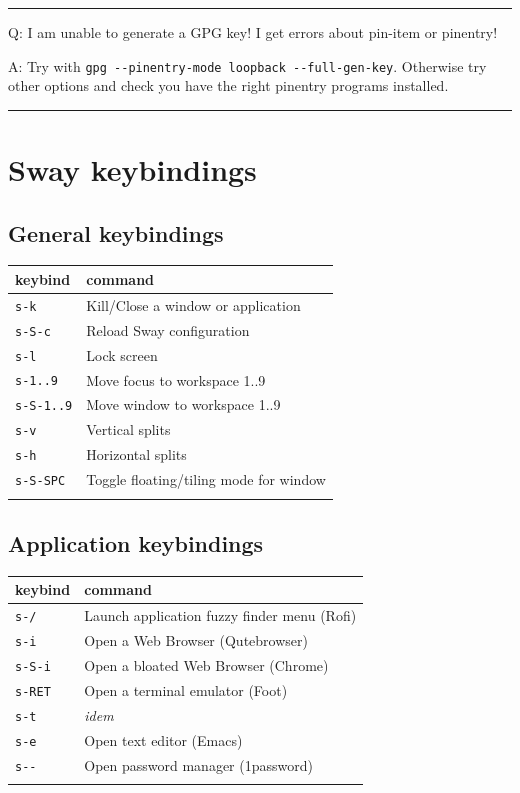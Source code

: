 \documentclass[11pt]{article}
\begin{document}
\noindent\rule{\textwidth}{0.5pt}

Q: I am unable to generate  a GPG key! I get errors about pin-item or pinentry!

A: Try with \texttt{gpg -{}-{}pinentry-mode loopback -{}-{}full-gen-key}. Otherwise try other options and check you have the right pinentry programs installed.

\noindent\rule{\textwidth}{0.5pt}

\section{Sway keybindings}
\label{sec:org735c8e1}

\subsection{General keybindings}
\label{sec:orgd6eaa6f}

\begin{center}
\begin{tabular}{ll}
keybind & command\\[0pt]
\hline
\texttt{s-k} & Kill/Close a window or application\\[0pt]
\texttt{s-S-c} & Reload Sway configuration\\[0pt]
\texttt{s-l} & Lock screen\\[0pt]
\texttt{s-1..9} & Move focus to workspace 1..9\\[0pt]
\texttt{s-S-1..9} & Move window to workspace 1..9\\[0pt]
\texttt{s-v} & Vertical splits\\[0pt]
\texttt{s-h} & Horizontal splits\\[0pt]
\texttt{s-S-SPC} & Toggle floating/tiling mode for window\\[0pt]
 & \\[0pt]
\hline
\end{tabular}
\end{center}

\subsection{Application keybindings}
\label{sec:org63887aa}


\begin{center}
\begin{tabular}{ll}
keybind & command\\[0pt]
\hline
\texttt{s-/} & Launch application fuzzy finder menu (Rofi)\\[0pt]
\texttt{s-i} & Open a Web Browser (Qutebrowser)\\[0pt]
\texttt{s-S-i} & Open a bloated Web Browser (Chrome)\\[0pt]
\texttt{s-RET} & Open a terminal emulator (Foot)\\[0pt]
\texttt{s-t} & \emph{idem}\\[0pt]
\texttt{s-e} & Open text editor (Emacs)\\[0pt]
\texttt{s-{}-{}} & Open password manager (1password)\\[0pt]
 & \\[0pt]
\hline
\end{tabular}
\end{center}
\end{document}
